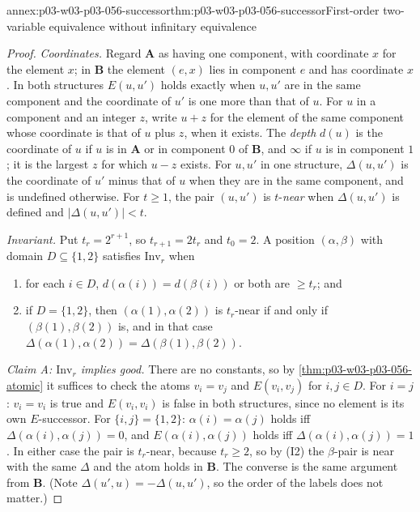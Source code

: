 \begin{annexitem}{annex:p03-w03-p03-056-successor}{thm:p03-w03-p03-056-successor}{First-order two-variable equivalence without infinitary equivalence}
\begin{proof}
\emph{Coordinates.} Regard \(\mathbf A\) as having one component, with
coordinate \(x\) for the element \(x\); in \(\mathbf B\) the element
\((e,x)\) lies in component \(e\) and has coordinate \(x\). In both
structures \(E(u,u')\) holds exactly when \(u,u'\) are in the same component
and the coordinate of \(u'\) is one more than that of \(u\). For \(u\) in a
component and an integer \(z\), write \(u+z\) for the element of the same
component whose coordinate is that of \(u\) plus \(z\), when it exists. The
\emph{depth} \(d(u)\) is the coordinate of \(u\) if \(u\) is in \(\mathbf A\)
or in component \(0\) of \(\mathbf B\), and \(\infty\) if \(u\) is in
component \(1\); it is the largest \(z\) for which \(u-z\) exists. For
\(u,u'\) in one structure, \(\Delta(u,u')\) is the coordinate of \(u'\) minus
that of \(u\) when they are in the same component, and is undefined
otherwise. For \(t\geq1\), the pair \((u,u')\) is \(t\)-\emph{near} when
\(\Delta(u,u')\) is defined and \(\lvert\Delta(u,u')\rvert<t\).

\emph{Invariant.} Put \(t_r=2^{r+1}\), so \(t_{r+1}=2t_r\) and \(t_0=2\). A
position \((\alpha,\beta)\) with domain \(D\subseteq\{1,2\}\) satisfies
\(\mathrm{Inv}_r\) when
\begin{enumerate}
\item[(I1)] for each \(i\in D\), \(d(\alpha(i))=d(\beta(i))\) or both are
      \(\geq t_r\); and
\item[(I2)] if \(D=\{1,2\}\), then \((\alpha(1),\alpha(2))\) is
      \(t_r\)-near if and only if \((\beta(1),\beta(2))\) is, and in that
      case \(\Delta(\alpha(1),\alpha(2))=\Delta(\beta(1),\beta(2))\).
\end{enumerate}

\emph{Claim A: \(\mathrm{Inv}_r\) implies good.} There are no constants, so
by \cref{thm:p03-w03-p03-056-atomic} it suffices to check the atoms
\(v_i=v_j\) and \(E(v_i,v_j)\) for \(i,j\in D\). For \(i=j\): \(v_i=v_i\) is
true and \(E(v_i,v_i)\) is false in both structures, since no element is
its own \(E\)-successor. For \(\{i,j\}=\{1,2\}\): \(\alpha(i)=\alpha(j)\)
holds iff \(\Delta(\alpha(i),\alpha(j))=0\), and \(E(\alpha(i),\alpha(j))\)
holds iff \(\Delta(\alpha(i),\alpha(j))=1\). In either case the pair is
\(t_r\)-near, because \(t_r\geq2\), so by (I2) the \(\beta\)-pair is near with
the same \(\Delta\) and the atom holds in \(\mathbf B\). The converse is the
same argument from \(\mathbf B\). (Note \(\Delta(u',u)=-\Delta(u,u')\), so the
order of the labels does not matter.)


\end{proof}
\end{annexitem}
